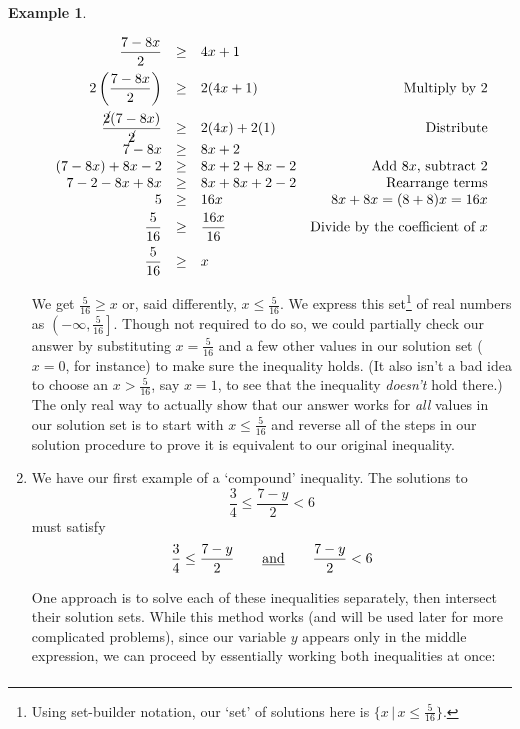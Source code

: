 \documentclass[11pt]{article}
\theoremstyle{definition}  %
\newtheorem{ex}{\bf Example}[section]
\begin{document}
\begin{ex}
\begin{enumerate}
\[\begin{array}{rclr}
\dfrac{7-8x}{2} & \geq & 4x + 1 & \\ [8pt]

2\left(\dfrac{7-8x}{2}\right) & \geq & 2(4x + 1) & \text{Multiply by $2$} \\ [10pt]

\dfrac{\cancel{2}(7-8x)}{\cancel{2}} & \geq & 2(4x) + 2(1) & \text{Distribute} \\ [3pt]

7 - 8x & \geq & 8x + 2 & \\

(7-8x) + 8x-2 & \geq & 8x+2 + 8x -2 & \text{Add $8x$, subtract $2$} \\

7 - 2 - 8x + 8x & \geq & 8x + 8x + 2 - 2 & \text{Rearrange terms} \\

5 & \geq &  16x & \text{$8x + 8x = (8+8)x = 16x$} \\ [3pt]

\dfrac{5}{16} & \geq & \dfrac{16x}{16} & \text{Divide by the coefficient of $x$} \\[8pt]

\dfrac{5}{16} & \geq & x & \\ 

\end{array} \]

We get $\frac{5}{16} \geq x$ or, said differently,  $x \leq \frac{5}{16}$.  We express this set\footnote{Using set-builder notation, our `set' of solutions here is $\{ x \, | \, x \leq \frac{5}{16} \}$.} of real numbers as  $\left(-\infty, \frac{5}{16}\right]$. Though not required to do so, we could partially check our answer by substituting $x = \frac{5}{16}$ and a few other values in our solution set ($x =0$, for instance) to make sure the inequality holds.  (It also isn't a bad idea to choose an $x > \frac{5}{16}$, say $x = 1$, to see that the inequality \textit{doesn't} hold there.)  The only real way to actually show that our answer works for \textit{all} values in our solution set is to start with $x \leq \frac{5}{16}$ and reverse all of the steps in our solution procedure to prove it is equivalent to our original inequality.  

\item  We have our first example of a `compound' inequality.  The solutions to  \[ \dfrac{3}{4} \leq \dfrac{7-y}{2} < 6 \] must satisfy \[ \dfrac{3}{4} \leq \dfrac{7-y}{2} \qquad \text{\underline{and}} \qquad \dfrac{7-y}{2} < 6\]

One approach is to solve each of these inequalities separately, then intersect their solution sets.  While this method works (and will be used later for more complicated problems), since our variable $y$ appears only in the middle expression, we can proceed by essentially working both inequalities at once:\[ \begin{array}{rclr}


\end{array}\]
\end{enumerate}
\end{ex}
\end{document}
